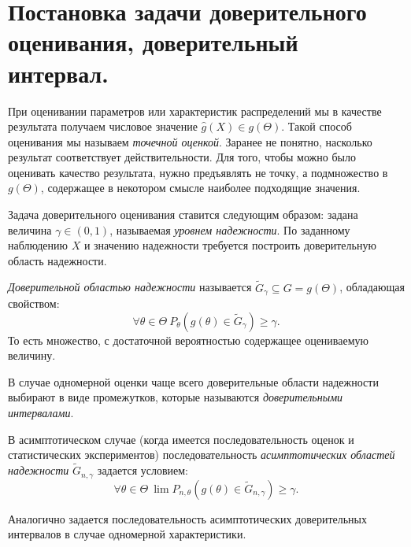 \section{Постановка задачи доверительного оценивания, доверительный интервал.}

При оценивании параметров или характеристик распределений мы в качестве
результата получаем числовое значение $\hat{g}(X) \in g(\Theta)$. Такой способ 
оценивания мы называем \textit{точечной оценкой}. Заранее не понятно, 
насколько результат соответствует действительности. Для того, чтобы можно 
было оценивать качество результата, нужно предъявлять не точку, а подмножество
в $g(\Theta)$, содержащее в некотором смысле наиболее подходящие значения.

Задача доверительного оценивания ставится следующим образом: задана величина
$\gamma \in (0, 1)$, называемая \textit{уровнем надежности}. По заданному
наблюдению $X$ и значению надежности требуется построить доверительную область
надежности.

\begin{definition}
    \textit{Доверительной областью надежности} называется $\widetilde{G}_\gamma
    \subseteq G = g(\Theta)$, обладающая свойством:
    \[
        \forall \theta \in \Theta~ P_\theta(g(\theta) \in \widetilde{G}_\gamma) 
        \geqslant \gamma
    .\]
    То есть множество, с достаточной вероятностью содержащее оцениваемую 
    величину.
\end{definition}

\begin{definition}
    В случае одномерной оценки чаще всего доверительные области надежности
    выбирают в виде промежутков, которые называются \textit{доверительными
    интервалами}.
\end{definition}

\begin{definition}
    В асимптотическом случае (когда имеется последовательность оценок и
    статистических экспериментов) последовательность \textit{асимптотических
    областей надежности} $\widetilde{G}_{n, \gamma}$ задается условием:
    \[
        \forall \theta \in \Theta~ \lim{P_{n, \theta}(g(\theta) \in 
        \widetilde{G}_{n, \gamma})} \geqslant \gamma
    .\]
\end{definition}

\begin{definition}
    Аналогично задается последовательность асимптотических доверительных
    интервалов в случае одномерной характеристики.
\end{definition}

